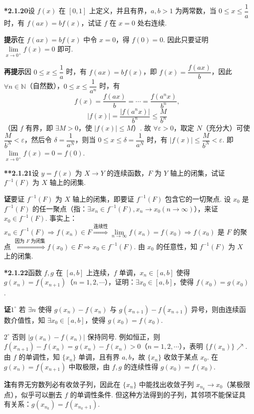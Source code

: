 \documentclass[UTF8,12pt,a4paper,fontset=fandol]{ctexart}
\begin{document}
\noindent\textbf{*2.1.20}\quad 设 $f(x)$ 在 $[0,1]$ 上定义，并且有界，$a,b>1$ 为两常数，当 $0\le x\le\dfrac1a$ 时，有 $f(ax)=bf(x)$，试证 $f$ 在 $x=0$ 处右连续.

\noindent\textbf{提示}\quad 在 $f(ax)=bf(x)$ 中令 $x=0$，得 $f(0)=0$. 因此只要证明 $\lim\limits_{x\to0^+}f(x)=0$ 即可.

\noindent\textbf{再提示}\quad 因 $0\le x\le\dfrac1a$ 时，有 $f(ax)=bf(x)$，即 $f(x)=\dfrac{f(ax)}b$，因此 $\forall n\in\mathbb{N}$（自然数），$0\le x\le\dfrac1{a^n}$ 时，有
\[
  f(x)=\frac{f(ax)}b=\cdots=\frac{f(a^n x)}{b^n},
\]
\[
  |f(x)|=\frac{|f(a^n x)|}{b^n}\le\frac{M}{b^n}
\]
（因 $f$ 有界，即 $\exists M>0$，使 $|f(x)|\le M$）. 故 $\forall\varepsilon>0$，取定 $N$（充分大）可使 $\dfrac{M}{b^N}<\varepsilon$，然后令 $\delta=\dfrac1{a^N}$，则当 $0\le x\le\delta=\dfrac1{a^N}$ 时，有 $|f(x)|\le\dfrac{M}{b^N}<\varepsilon$. 即 $\lim\limits_{x\to0^+}f(x)=0=f(0)$.

\noindent\textbf{**2.1.21}\quad 设 $y=f(x)$ 为 $X\to Y$ 的连续函数，$F$ 为 $Y$ 轴上的闭集，试证 $f^{-1}(F)$ 为 $X$ 轴上的闭集.

\noindent\textbf{证}\quad 要证 $f^{-1}(F)$ 为 $X$ 轴上的闭集，即要证 $f^{-1}(F)$ 包含它的一切聚点. 设 $x_0$ 是 $f^{-1}(F)$ 的任一聚点（指：$\exists x_n\in f^{-1}(F),x_n\to x_0(n\to\infty)$），来证 $x_0\in f^{-1}(F)$. 事实上：$x_n\in f^{-1}(F)\Rightarrow f(x_n)\in F \overset{\text{连续性}}{\Longrightarrow}\lim\limits_{n\to\infty}f(x_n)=f(x_0)\Rightarrow f(x_0)$ 是 $F$ 的聚点 $\overset{\text{因为 }F\text{ 为闭集}}{\Longrightarrow}f(x_0)\in F\Rightarrow x_0\in f^{-1}(F)$. 由 $x_0$ 的任意性，知 $f^{-1}(F)$ 为 $X$ 上的闭集.

\noindent\textbf{*2.1.22}\quad 函数 $f,g$ 在 $[a,b]$ 上连续，$f$ 单调，$x_n\in[a,b]$ 使得 $g(x_n)=f(x_{n+1})$（$n=1,2,\cdots$），证明：$\exists x_0\in[a,b]$，使得 $f(x_0)=g(x_0)$.

\noindent\textbf{证}\quad $1^\circ$ 若 $\exists n$ 使得 $g(x_n)-f(x_n)$ 与 $g(x_{n+1})-f(x_{n+1})$ 异号，则由连续函数介值性，知 $\exists x_0\in[a,b]$，使得 $g(x_0)=f(x_0)$.

$2^\circ$ 否则 $|g(x_n)-f(x_n)|$ 保持同号. 例如恒正，则 $f(x_{n+1})-f(x_n)=g(x_n)-f(x_n)>0$（$n=1,2,\cdots$），表明 $\{f(x_n)\}\nearrow$. 由 $f$ 的单调性，知 $\{x_n\}$ 单调，且有界 $a,b$，故 $\{x_n\}$ 收敛于某点 $x_0$. 在 $g(x_n)=f(x_{n+1})$ 中取极限，由 $f,g$ 的连续性得 $g(x_0)=f(x_0)$.

\noindent\textbf{注}\quad 有界无穷数列必有收敛子列，因此在 $\{x_n\}$ 中能找出收敛子列 $x_{n_k}\to x_0$（某极限点），似乎可以删去 $f$ 的单调性条件. 但这种方法得到的子列，其邻项不能保证具有关系：$g(x_{n_k})=f(x_{n_k+1})$.
\end{document}
